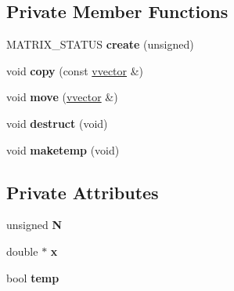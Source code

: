 \subsection*{Private Member Functions}
\begin{DoxyCompactItemize}
\item 
M\+A\+T\+R\+I\+X\+\_\+\+S\+T\+A\+T\+US {\bfseries create} (unsigned)\hypertarget{classvvector_a414fde74615db87df3a4847212d35eb1}{}\label{classvvector_a414fde74615db87df3a4847212d35eb1}

\item 
void {\bfseries copy} (const \hyperlink{classvvector}{vvector} \&)\hypertarget{classvvector_a201eb7c7e9ceaa18854c6d46b8cf2ff8}{}\label{classvvector_a201eb7c7e9ceaa18854c6d46b8cf2ff8}

\item 
void {\bfseries move} (\hyperlink{classvvector}{vvector} \&)\hypertarget{classvvector_acae2dae664a3d736dfcd68265a5b3bc3}{}\label{classvvector_acae2dae664a3d736dfcd68265a5b3bc3}

\item 
void {\bfseries destruct} (void)\hypertarget{classvvector_a570b2e72ddf5b5b05a4a80f0011dc01b}{}\label{classvvector_a570b2e72ddf5b5b05a4a80f0011dc01b}

\item 
void {\bfseries maketemp} (void)\hypertarget{classvvector_a149b088a7caafe9126aaaf91ea7abc67}{}\label{classvvector_a149b088a7caafe9126aaaf91ea7abc67}

\end{DoxyCompactItemize}
\subsection*{Private Attributes}
\begin{DoxyCompactItemize}
\item 
unsigned {\bfseries N}\hypertarget{classvvector_ac9411e8a311da1558f05f69921102feb}{}\label{classvvector_ac9411e8a311da1558f05f69921102feb}

\item 
double $\ast$ {\bfseries x}\hypertarget{classvvector_ac7bbe812ca5c904902ea81443eb1b7ab}{}\label{classvvector_ac7bbe812ca5c904902ea81443eb1b7ab}

\item 
bool {\bfseries temp}\hypertarget{classvvector_a08c0b1f26e95a48a61bd16f4b6398938}{}\label{classvvector_a08c0b1f26e95a48a61bd16f4b6398938}

\end{DoxyCompactItemize}
